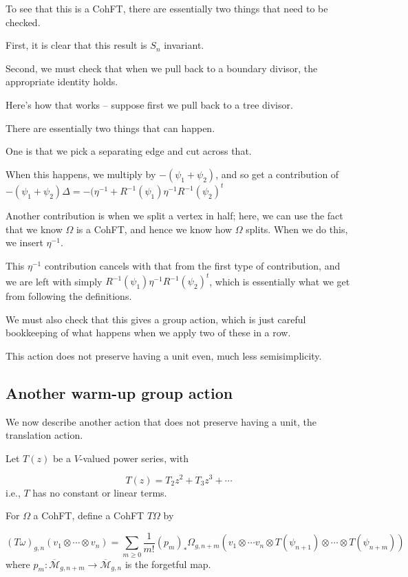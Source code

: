 \documentclass{amsart}
\theoremstyle{definition}
\newcommand{\Mbar}{\overline{\mathcal{M}}}
\begin{document}
To see that this is a CohFT, there are essentially two things that need to be checked.

First, it is clear that this result is $S_n$ invariant.

Second, we must check that when we pull back to a boundary divisor, the appropriate identity holds.

Here's how that works -- suppose first we pull back to a tree divisor.

There are essentially two things that can happen.

One is that we pick a separating edge and cut across that.

When this happens, we multiply by $-(\psi_1+\psi_2)$, and so get a contribution of $-(\psi_1+\psi_2)\Delta=-(\eta^{-1}+R^{-1}(\psi_1)\eta^{-1}R^{-1}(\psi_2)^t$

Another contribution is when we split a vertex in half; here, we can use the fact that we know $\Omega$ is a CohFT, and hence we know how $\Omega$ splits.  When we do this, we insert $\eta^{-1}$.  

This $\eta^{-1}$ contribution cancels with that from the first type of contribution, and we are left with simply $R^{-1}(\psi_1)\eta^{-1}R^{-1}(\psi_2)^t$, which is essentially what we get from following the definitions.

We must also check that this gives a group action, which is just careful bookkeeping of what happens when we apply two of these in a row.

This action does not preserve having a unit even, much less semisimplicity.

\subsection{Another warm-up group action}

We now describe another action that does not preserve having a unit, the translation action.

Let $T(z)$ be a $V$-valued power series, with

$$T(z)=T_2z^2+T_3z^3+\cdots$$
i.e., $T$ has no constant or linear terms.

For $\Omega$ a CohFT, define a CohFT $T\Omega$ by

$$(T\omega)_{g,n}(v_1\otimes\cdots\otimes v_n)=\sum_{m\geq 0} \frac{1}{m!} (p_m)_*\Omega_{g,n+m}\left(v_1\otimes\cdots v_n\otimes T(\psi_{n+1})\otimes\cdots\otimes T(\psi_{n+m})\right)$$
where $p_m:\Mbar_{g,n+m}\to \Mbar_{g,n}$ is the forgetful map.
\end{document}
